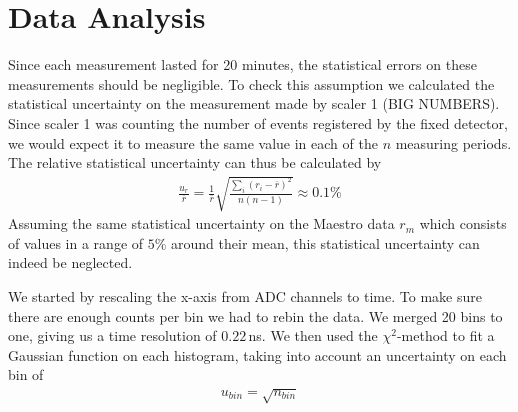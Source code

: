\documentclass[a4paper,parskip,11pt, DIV12]{scrreprt}
\begin{document}
\chapter{Data Analysis}
Since each measurement lasted for 20 minutes, the statistical errors on these measurements should be negligible. To check this assumption we calculated the statistical uncertainty on the measurement made by scaler 1 (BIG NUMBERS). Since scaler 1 was counting the number of events registered by the fixed detector, we would expect it to measure the same value in each of the $n$ measuring periods. The relative statistical uncertainty can thus be calculated by
%
\begin{align}
\frac{u_r}{\overline{r}} = \frac{1}{\overline{r}}\sqrt{\frac{\sum_i (r_i - \overline{r})^2}{n(n-1)}} \approx 0.1\%
\end{align}
%
Assuming the same statistical uncertainty on the Maestro data $r_m$ which consists of values in a range of $5\%$ around their mean, this statistical uncertainty can indeed be neglected.



We started by rescaling the x-axis from ADC channels to time. To make sure there are enough counts per bin we had to rebin the data. We merged 20 bins to one, giving us a time resolution of $0.22\,$ns. We then used the $\chi^2$-method to fit a Gaussian function on each histogram, taking into account an uncertainty on each bin of 
%
\begin{align}
u_{bin} = \sqrt{n_{bin}}
\end{align}
\end{document}
